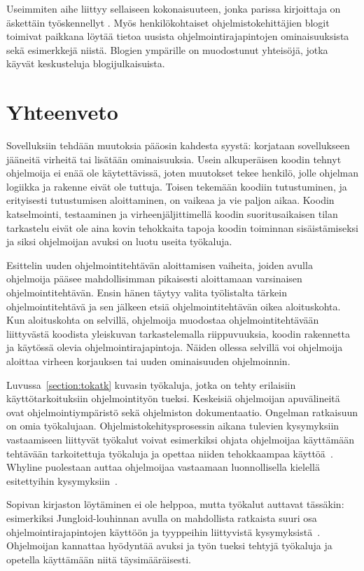 \documentclass[finnish]{tktltiki2}
\theoremstyle{definition}
\theoremstyle{remark}
\begin{document}
Useimmiten aihe liittyy sellaiseen kokonaisuuteen, jonka parissa kirjoittaja on äskettäin työskennellyt \cite{how-dev-blog}.
Myös henkilökohtaiset ohjelmistokehittäjien blogit toimivat paikkana löytää tietoa uusista ohjelmointirajapintojen ominaisuuksista sekä esimerkkejä niistä. Blogien ympärille on muodostunut yhteisöjä, jotka käyvät keskusteluja blogijulkaisuista.

\section{Yhteenveto}

Sovelluksiin tehdään muutoksia pääosin kahdesta syystä: korjataan sovellukseen jääneitä virheitä tai lisätään ominaisuuksia. Usein alkuperäisen koodin tehnyt ohjelmoija ei enää ole käytettävissä, joten muutokset tekee henkilö, jolle ohjelman logiikka ja rakenne eivät ole tuttuja.
Toisen tekemään koodiin tutustuminen, ja erityisesti tutustumisen aloittaminen, on vaikeaa ja vie paljon aikaa. Koodin katselmointi, testaaminen ja virheenjäljittimellä koodin suoritusaikaisen tilan tarkastelu eivät ole aina kovin tehokkaita tapoja koodin toiminnan sisäistämiseksi ja siksi ohjelmoijan avuksi on luotu useita työkaluja.

Esittelin uuden ohjelmointitehtävän aloittamisen vaiheita, joiden avulla ohjelmoija pääsee mahdollisimman pikaisesti aloittamaan varsinaisen ohjelmointitehtävän. Ensin hänen täytyy valita työlistalta tärkein ohjelmointitehtävä ja sen jälkeen etsiä ohjelmointitehtävän oikea aloituskohta. Kun aloituskohta on selvillä, ohjelmoija muodostaa ohjelmointitehtävään liittyvästä koodista yleiskuvan tarkastelemalla riippuvuuksia, koodin rakennetta ja käytössä olevia ohjelmointirajapintoja. Näiden ollessa selvillä voi ohjelmoija aloittaa virheen korjauksen tai uuden ominaisuuden ohjelmoinnin.

Luvussa~\ref{section:tokatk} kuvasin työkaluja, jotka on tehty erilaisiin käyttötarkoituksiin ohjelmointityön tueksi. Keskeisiä ohjelmoijan apuvälineitä ovat ohjelmointiympäristö sekä ohjelmiston dokumentaatio.
Ongelman ratkaisuun on omia työkalujaan. Ohjelmistokehitysprosessin aikana tulevien kysymyksiin vastaamiseen liittyvät työkalut voivat esimerkiksi ohjata ohjelmoijaa käyttämään tehtävään tarkoitettuja työkaluja ja opettaa niiden tehokkaampaa käyttöä~\cite{programmers-coach}. Whyline puolestaan auttaa ohjelmoijaa vastaamaan luonnollisella kielellä esitettyihin kysymyksiin~\cite{whyline}.

Sopivan kirjaston löytäminen ei ole helppoa, mutta työkalut auttavat tässäkin:
esimerkiksi Jungloid-louhinnan avulla on mahdollista ratkaista suuri osa ohjelmointirajapintojen käyttöön ja tyyppeihin liittyvistä kysymyksistä~\cite{jungloid-mining}.
Ohjelmoijan kannattaa hyödyntää avuksi ja työn tueksi tehtyjä työkaluja ja opetella käyttämään niitä täysimääräisesti.
\end{document}
